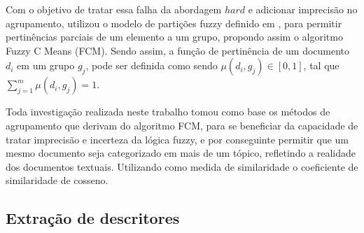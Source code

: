 Com o objetivo de tratar essa falha da abordagem $hard$ e adicionar imprecisão no agrupamento,
\cite{Bezdek1984} utilizou o modelo de partições fuzzy definido em \cite{Zadeh1965}, para permitir
pertinências parciais de um elemento a um grupo, propondo assim o algoritmo Fuzzy C Means (FCM). 
Sendo assim, a função de pertinência de um documento $d_{i}$ em um grupo $g_{j}$, pode ser definida como sendo $\mu(d_{i}, g_{j}) \in [0,1]$, 
tal que $\sum_{j=1}^m \mu(d_{i}, g_{j}) = 1$.

Toda investigação realizada neste trabalho tomou como base os métodos de agrupamento que 
derivam do algoritmo FCM\cite{Bezdek1984}, para se beneficiar da capacidade de tratar imprecisão e 
incerteza da lógica fuzzy, e por conseguinte permitir que um mesmo documento seja categorizado 
em mais de um tópico, refletindo a realidade dos documentos textuais. Utilizando como medida
de similaridade o coeficiente de similaridade de cosseno.


\subsection{Extração de descritores}

